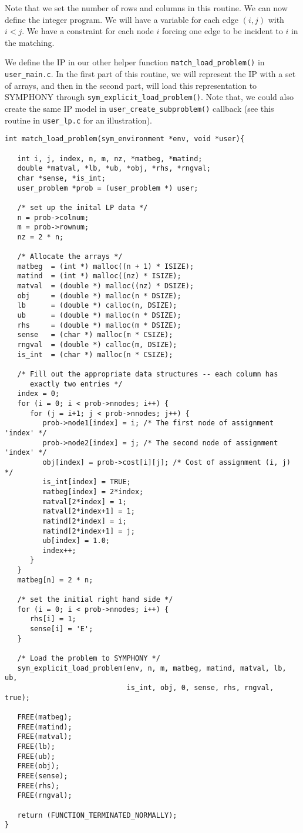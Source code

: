 \documentclass[11pt]{article}
\begin{document}
Note that we set the number of rows and columns in this routine. We can now
define the integer program. We will have a variable for each edge $(i,j)$ with
$i<j$. We have a constraint for each node $i$ forcing one edge to be incident
to $i$ in the matching.

We define the IP in our other helper function 
\texttt{match\_load\_problem()} in \texttt{user\_main.c}. In the 
first part of this routine, we will represent the IP with a set of arrays, 
and then in the second part, will load this representation to SYMPHONY through 
\texttt{sym\_explicit\_load\_problem()}. Note that, we could also create the 
same IP model in \texttt{user\_create\_subproblem()} callback (see 
this routine in \texttt{user\_lp.c} for an illustration).

\begin{verbatim}
int match_load_problem(sym_environment *env, void *user){
   
   int i, j, index, n, m, nz, *matbeg, *matind;
   double *matval, *lb, *ub, *obj, *rhs, *rngval;
   char *sense, *is_int;
   user_problem *prob = (user_problem *) user;

   /* set up the inital LP data */
   n = prob->colnum;
   m = prob->rownum;
   nz = 2 * n;

   /* Allocate the arrays */
   matbeg  = (int *) malloc((n + 1) * ISIZE);
   matind  = (int *) malloc((nz) * ISIZE);
   matval  = (double *) malloc((nz) * DSIZE);
   obj     = (double *) malloc(n * DSIZE);
   lb      = (double *) calloc(n, DSIZE);
   ub      = (double *) malloc(n * DSIZE);
   rhs     = (double *) malloc(m * DSIZE);
   sense   = (char *) malloc(m * CSIZE);
   rngval  = (double *) calloc(m, DSIZE);
   is_int  = (char *) malloc(n * CSIZE);
   
   /* Fill out the appropriate data structures -- each column has
      exactly two entries */
   index = 0;
   for (i = 0; i < prob->nnodes; i++) {
      for (j = i+1; j < prob->nnodes; j++) {
         prob->node1[index] = i; /* The first node of assignment 'index' */
         prob->node2[index] = j; /* The second node of assignment 'index' */
         obj[index] = prob->cost[i][j]; /* Cost of assignment (i, j) */
         is_int[index] = TRUE;
         matbeg[index] = 2*index;
         matval[2*index] = 1;
         matval[2*index+1] = 1;
         matind[2*index] = i;
         matind[2*index+1] = j;
         ub[index] = 1.0;
         index++;
      }
   }
   matbeg[n] = 2 * n;
   
   /* set the initial right hand side */
   for (i = 0; i < prob->nnodes; i++) {
      rhs[i] = 1;
      sense[i] = 'E';
   }

   /* Load the problem to SYMPHONY */   
   sym_explicit_load_problem(env, n, m, matbeg, matind, matval, lb, ub, 
                             is_int, obj, 0, sense, rhs, rngval, true);
			     
   FREE(matbeg);
   FREE(matind);
   FREE(matval);
   FREE(lb);
   FREE(ub);
   FREE(obj);
   FREE(sense);
   FREE(rhs);
   FREE(rngval);

   return (FUNCTION_TERMINATED_NORMALLY);
}
\end{verbatim}
\end{document}

